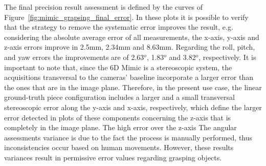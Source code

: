 The final precision result assessment is defined by the curves of Figure~\ref{fig:mimic_grapsing_final_error}. In these plots it is possible to verify that the strategy to remove the systematic error improves the result, e.g. considering the absolute average error of all measurements, the x-axis, y-axis and z-axis errors improve in 2.5mm, 2.34mm and 8.63mm. Regarding the roll, pitch, and yaw errors the improvements are of 2.63$^o$, 1.83$^o$ and 3.82$^o$, respectively. It is important to note that, since the 6D Mimic is a stereoscopic system, the acquisitions transversal to the cameras' baseline incorporate a larger error than the ones that are in the image plane. Therefore, in the present use case,  the linear ground-truth piece configuration includes a larger and a small transversal stereoscopic error along the y-axis and x-axis, respectively, which define the larger error detected in plots of these components concerning the z-axis that is completely in the image plane. The high error over the z-axis The angular assessments variance is due to the fact the process is manually performed, thus inconsistencies occur based on human movements. However, these results variances result in permissive error values regarding grasping objects.

